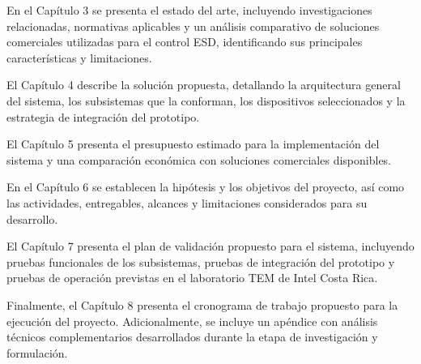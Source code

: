En el Capítulo 3 se presenta el estado del arte, incluyendo investigaciones relacionadas,
normativas aplicables y un análisis comparativo de soluciones comerciales utilizadas para
el control ESD, identificando sus principales características y limitaciones.

El Capítulo 4 describe la solución propuesta, detallando la arquitectura general del
sistema, los subsistemas que la conforman, los dispositivos seleccionados y la estrategia
de integración del prototipo.

El Capítulo 5 presenta el presupuesto estimado para la implementación del sistema y una
comparación económica con soluciones comerciales disponibles.

En el Capítulo 6 se establecen la hipótesis y los objetivos del proyecto, así como las
actividades, entregables, alcances y limitaciones considerados para su desarrollo.

El Capítulo 7 presenta el plan de validación propuesto para el sistema, incluyendo pruebas
funcionales de los subsistemas, pruebas de integración del prototipo y pruebas de operación
previstas en el laboratorio TEM de Intel Costa Rica.

Finalmente, el Capítulo 8 presenta el cronograma de trabajo propuesto para la ejecución
del proyecto. Adicionalmente, se incluye un apéndice con análisis técnicos complementarios
desarrollados durante la etapa de investigación y formulación.
